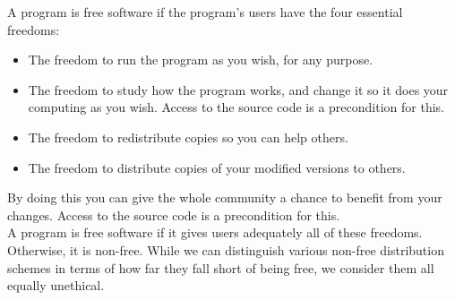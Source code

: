 \documentclass[6pt,a4paper]{report}
\begin{document}
A program is free software if the program's users have the four essential freedoms:	\\
\begin{itemize}
\item The freedom to run the program as you wish, for any purpose.
\item The freedom to study how the program works, and change it so it does your computing as you wish. Access to the source code is a precondition for this.
\item The freedom to redistribute copies so you can help others.
\item The freedom to distribute copies of your modified versions to others. 

\end{itemize}

By doing this you can give the whole community a chance to benefit from your changes. Access to the source code is a precondition for this. \\

A program is free software if it gives users adequately all of these freedoms. Otherwise, it is non-free. While we can distinguish various non-free distribution schemes in terms of how far they fall short of being free, we consider them all equally unethical.
\end{document}

